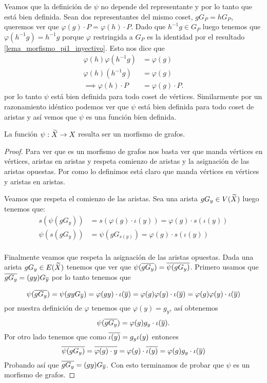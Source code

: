 \documentclass[tesis.tex]{subfiles}
\begin{document}
Veamos que la definición de $\psi$ no depende del representante y por lo tanto que está bien definida.
Sean dos representantes del mismo coset, $gG_{P} = hG_{P}$, queremos ver que $\varphi(g) \cdot P = \varphi(h) \cdot P$.
Dado que $h^{-1}g \in G_P$ luego tenemos que $\varphi(h^{-1}g) = h^{-1}g$ porque $\varphi$ restringida a $G_P$ es la identidad por el resultado \ref{lema_morfismo_pi1_inyectivo}.
Esto nos dice que 
\begin{align*}
		\varphi(h) \varphi(h^{-1}g) &= \varphi(g) \\
		\varphi(h) (h^{-1}g) & = \varphi(g) \\
		\implies \varphi(h) \cdot P &= \varphi(g) \cdot P.
\end{align*}
por lo tanto $\psi$ está bien definida para todo coset de vértices.
Similarmente por un razonamiento idéntico podemos ver que $\psi$ está bien definida para todo coset de aristas y así vemos que $\psi$ es una función bien definida.

\begin{lema}
	La función $\psi: \widetilde X \to X$ resulta ser un morfismo de grafos.
\end{lema}

\begin{proof}
Para ver que es un morfismo de grafos nos basta ver que manda vértices en vértices, aristas en aristas y respeta comienzo de aristas y la asignación de las aristas opuestas.
Por como lo definimos está claro que manda vértices en vértices y aristas en aristas.

Veamos que respeta el comienzo de las aristas.
Sea una arista $gG_y \in V(\widetilde X)$ luego tenemos que:
\begin{align*}
s(\psi(gG_y  )) &= s (\varphi(g) \cdot \iota(y)) =  \varphi(g) \cdot  s(\iota(y)) 	\\ 
\psi(s(gG_y ))  &= \psi(gG_{s(y)} ) = \varphi(g) \cdot {s(\iota(y))} \\
\end{align*}	

Finalmente veamos que respeta la asignación de las aristas opuestas.	
Dada una arista $g G_y \in E(\widetilde X)$ tenemos que ver que $\psi(\overline{g G_y }) = \overline{\psi(g G_y )}$.	
Primero usamos que $\overline{g G_y } = (gy)G_{\overline y}$ por lo tanto tenemos que 

\[
	\psi(\overline{gG_y  }) = \psi(gyG_{\overline y}) = \varphi(gy) \cdot \iota(\overline y)  = \varphi(g)\varphi(y) \cdot \iota(\overline y) = \varphi(g)\varphi(y) \cdot \iota(\overline y)      	
\]
por nuestra definición de $\varphi$ tenemos que $\varphi(y) = g_{y}$, así obtenemos
\[
	\psi(\overline{gG_y  }) =  \varphi(g) g_y \cdot \iota(\overline y). 
\]
Por otro lado tenemos que como $\overline{\iota(y)} = g_{y}\iota(y)$ entonces
\[
	\overline{\psi(gG_y )} = \overline{ \varphi(g) \cdot  y } = \varphi(g) \cdot  \overline{\iota( y)} = \varphi(g)g_{y} \cdot \iota(\overline y) 
\]
Probando así que $ \overline{g G_y } = (gy)G_{\overline y} $.
Con esto terminamos de probar que $\psi$ es un morfismo de grafos.

\end{proof}
\end{document}
